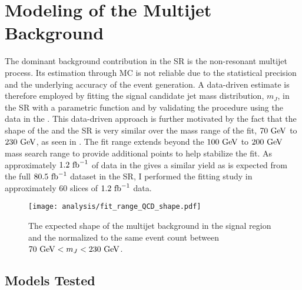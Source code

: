 \section{Modeling of the Multijet Background}\label{sec:multijet_background_modeling}

The dominant background contribution in the SR is the non-resonant multijet process.
Its estimation through MC is not reliable due to the statistical precision and the underlying accuracy of the event generation.
A data-driven estimate is therefore employed by fitting the signal candidate \largeR{} jet mass distribution, $m_{J}$, in the SR with a parametric function and by validating the procedure using the data in the \CRQCD{}.
This data-driven approach is further motivated by the fact that the shape of the \CRQCD{} and the SR is very similar over the mass range of the fit, $70~\mathrm{GeV}$ to $230~\mathrm{GeV}$, as seen in .
The fit range extends beyond the $100~\mathrm{GeV}$ to $200~\mathrm{GeV}$ mass search range to provide additional points to help stabilize the fit.
As approximately $1.2~\mathrm{fb}^{-1}$ of data in the \CRQCD{} gives a similar yield as is expected from the full $80.5~\mathrm{fb}^{-1}$ dataset in the SR, I performed the fitting study in approximately 60 slices of $1.2~\mathrm{fb}^{-1}$ \CRQCD{} data.

\begin{figure}[htbp]
 \centering
 \texttt{[image: analysis/fit\_range\_QCD\_shape.pdf]}
 \caption[Comparison of the multijet background shape in the signal region and $0$-tag control region (\CRQCD{}).]{%
  The expected shape of the multijet background in the signal region and the \CRQCD{} normalized to the same event count between $70~\mathrm{GeV} < m_{J} < 230~\mathrm{GeV}$.}
 \label{fig:fit_range_QCD_shape}
\end{figure}

\subsection{Models Tested}\label{sec:models_tested}

